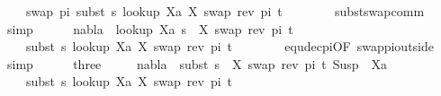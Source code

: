 \begin{isabellebody}
\ \ \ \ swap\ pi\ {\isacharparenleft}{\kern0pt}subst\ s\ {\isacharparenleft}{\kern0pt}look{\isacharunderscore}{\kern0pt}up\ Xa\ {\isacharbrackleft}{\kern0pt}{\isacharparenleft}{\kern0pt}X{\isacharcomma}{\kern0pt}\ swap\ {\isacharparenleft}{\kern0pt}rev\ pi{\isacharparenright}{\kern0pt}\ t{\isacharparenright}{\kern0pt}{\isacharbrackright}{\kern0pt}{\isacharparenright}{\kern0pt}{\isacharparenright}{\kern0pt}{\isachardoublequoteclose}\isanewline
\ \ \ \ \ \ \isamarkupfalse%
\ subst{\isacharunderscore}{\kern0pt}swap{\isacharunderscore}{\kern0pt}comm\ \isamarkupfalse%
\ simp\isanewline
\ \ \ \ \isamarkupfalse%
\ {\isachardoublequoteopen}nabla\ {\isasymturnstile}\ {\isacharparenleft}{\kern0pt}look{\isacharunderscore}{\kern0pt}up\ Xa\ {\isacharparenleft}{\kern0pt}s\ {\isasymbullet}\ {\isacharbrackleft}{\kern0pt}{\isacharparenleft}{\kern0pt}X{\isacharcomma}{\kern0pt}\ swap\ {\isacharparenleft}{\kern0pt}rev\ pi{\isacharparenright}{\kern0pt}\ t{\isacharparenright}{\kern0pt}{\isacharbrackright}{\kern0pt}{\isacharparenright}{\kern0pt}{\isacharparenright}{\kern0pt}\ {\isasymapprox}\ \isanewline
\ \ \ \ {\isacharparenleft}{\kern0pt}subst\ s\ {\isacharparenleft}{\kern0pt}look{\isacharunderscore}{\kern0pt}up\ Xa\ {\isacharbrackleft}{\kern0pt}{\isacharparenleft}{\kern0pt}X{\isacharcomma}{\kern0pt}\ swap\ {\isacharparenleft}{\kern0pt}rev\ pi{\isacharparenright}{\kern0pt}\ t{\isacharparenright}{\kern0pt}{\isacharbrackright}{\kern0pt}{\isacharparenright}{\kern0pt}{\isacharparenright}{\kern0pt}{\isachardoublequoteclose}\isanewline
\ \ \ \ \ \ \isamarkupfalse%
\ equ{\isacharunderscore}{\kern0pt}dec{\isacharunderscore}{\kern0pt}pi{\isacharbrackleft}{\kern0pt}OF\ swap{\isacharunderscore}{\kern0pt}pi{\isacharunderscore}{\kern0pt}outside{\isacharbrackright}{\kern0pt}\ \isamarkupfalse%
\ simp\isanewline
\ \ \ \ \isamarkupfalse%
\ three{\isacharcolon}{\kern0pt}\ \isanewline
\ \ \ \ {\isachardoublequoteopen}nabla\ {\isasymturnstile}\ subst\ {\isacharparenleft}{\kern0pt}s\ {\isasymbullet}\ {\isacharbrackleft}{\kern0pt}{\isacharparenleft}{\kern0pt}X{\isacharcomma}{\kern0pt}\ swap\ {\isacharparenleft}{\kern0pt}rev\ pi{\isacharparenright}{\kern0pt}\ t{\isacharparenright}{\kern0pt}{\isacharbrackright}{\kern0pt}{\isacharparenright}{\kern0pt}\ {\isacharparenleft}{\kern0pt}Susp\ {\isacharbrackleft}{\kern0pt}{\isacharbrackright}{\kern0pt}\ Xa{\isacharparenright}{\kern0pt}\ {\isasymapprox}\ \isanewline
\ \ \ \ {\isacharparenleft}{\kern0pt}subst\ s\ {\isacharparenleft}{\kern0pt}look{\isacharunderscore}{\kern0pt}up\ Xa\ {\isacharbrackleft}{\kern0pt}{\isacharparenleft}{\kern0pt}X{\isacharcomma}{\kern0pt}\ swap\ {\isacharparenleft}{\kern0pt}rev\ pi{\isacharparenright}{\kern0pt}\ t{\isacharparenright}{\kern0pt}{\isacharbrackright}{\kern0pt}{\isacharparenright}{\kern0pt}{\isacharparenright}{\kern0pt}{\isachardoublequoteclose}\ \isanewline

\end{isabellebody}
